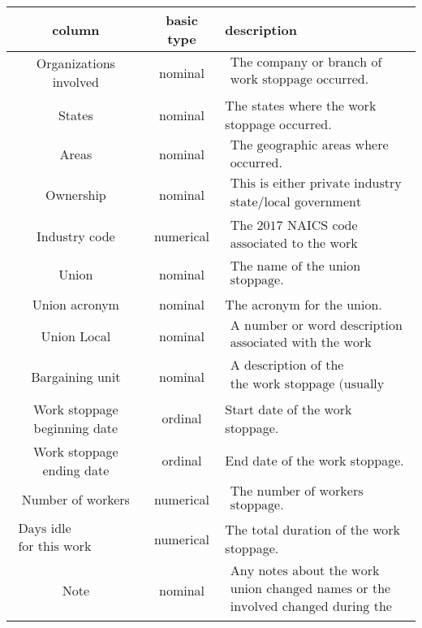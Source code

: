 \documentclass[reqno,11pt]{amsart}
\begin{document}
\begin{tabular}{ccl}
column & basic type & description
\\\hline
Organizations involved 
	& 
	nominal
	&
	$\substack{\displaystyle\text{The company or branch of government where the}
	\\\displaystyle\text{work stoppage occurred.}}$
\\
States
	&
	nominal
	&
	The states where the work stoppage occurred.
\\
Areas
	&
	nominal
	&
	$\substack{\displaystyle\text{The geographic areas where the work stoppage }
	\\\displaystyle\text{occurred.}}$
\\
Ownership
	&
	nominal
	&
	$\substack{\displaystyle\text{This is either private industry (private sector) or}
	\\\displaystyle\text{state/local government (public sector).}}$
\\
Industry code	
	&
	numerical
	&
	$\substack{\displaystyle\text{The 2017 NAICS code describing the industry}
	\\\displaystyle\text{associated to the work stoppage.}}$
\\
Union	
	&
	nominal
	&
	$\substack{\displaystyle\text{The name of the union associated with the work} 
	\\\displaystyle\text{stoppage.}}$
\\
Union acronym	
	&
	nominal
	&
	The acronym for the union.
\\
Union Local	
	&
	nominal
	&
	$\substack{\displaystyle\text{A number or word description of the local union}
	\\\displaystyle\text{associated with the work stoppage.}}$
\\
Bargaining unit	
	&
	nominal
	&
	$\substack{\displaystyle\text{A description of the bargaining unit for}
	\\\displaystyle\text{the work stoppage (usually empty).}}$
\\
Work stoppage beginning date	
	&
	ordinal
	&
	Start date of the work stoppage.	
\\
Work stoppage ending date	
	&
	ordinal
	&
	End date of the work stoppage.	
\\	
Number of workers
	&
	numerical
	&
	$\substack{\displaystyle\text{The number of workers involved in the work}
	\\\displaystyle\text{stoppage.}}$
\\
$\substack{\displaystyle\text{Days idle cumulative}\\\displaystyle\text{for this work stoppage}}$
	&
	numerical
	&
	The total duration of the work stoppage.
\\
Note
	&
	nominal
	&
	$\substack{\displaystyle\text{Any notes about the work stoppage (e.g., the}
	\\\displaystyle\text{union changed names or the number of workers}
	\\\displaystyle\text{involved changed during the work stoppage).}}$
\end{tabular}
\end{document}
